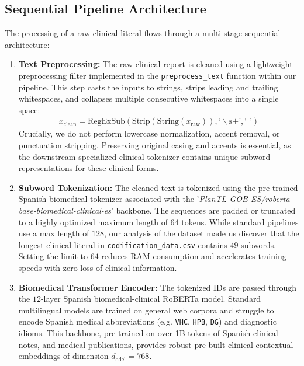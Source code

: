 \documentclass{article}
\begin{document}
\subsection{Sequential Pipeline Architecture}
The processing of a raw clinical literal flows through a multi-stage sequential architecture:
\begin{enumerate}
    \item \textbf{Text Preprocessing:} The raw clinical report is cleaned using a lightweight preprocessing filter implemented in the \texttt{preprocess\_text} function within our pipeline. This step casts the inputs to strings, strips leading and trailing whitespaces, and collapses multiple consecutive whitespaces into a single space:
    \begin{align}
        x_{\text{clean}} = \text{RegExSub}(\text{Strip}(\text{String}(x_{\text{raw}})), \text{`}\backslash\text{s+}\text{'}, \text{` }\text{'})
    \end{align}
    Crucially, we do not perform lowercase normalization, accent removal, or punctuation stripping. Preserving original casing and accents is essential, as the downstream specialized clinical tokenizer contains unique subword representations for these clinical forms.
    
    \item \textbf{Subword Tokenization:} The cleaned text is tokenized using the pre-trained Spanish biomedical tokenizer associated with the '\textit{PlanTL-GOB-ES/roberta-base-biomedical-clinical-es}' backbone. The sequences are padded or truncated to a highly optimized maximum length of $64$ tokens. While standard pipelines use a max length of $128$, our analysis of the dataset made us discover that the longest clinical literal in \texttt{codification\_data.csv} contains $49$ subwords. Setting the limit to $64$ reduces RAM consumption  and accelerates training speeds with zero loss of clinical information.
    
    \item \textbf{Biomedical Transformer Encoder:} The tokenized IDs are passed through the $12$-layer Spanish biomedical-clinical RoBERTa model. Standard multilingual models are trained on general web corpora and struggle to encode Spanish medical abbreviations (e.g. \texttt{VHC}, \texttt{HPB}, \texttt{DG}) and diagnostic idioms. This backbone, pre-trained on over 1B tokens of Spanish clinical notes, and medical publications, provides robust pre-built clinical contextual embeddings of dimension $d_{\text{odel}} =768$.
    

\end{enumerate}
\end{document}
